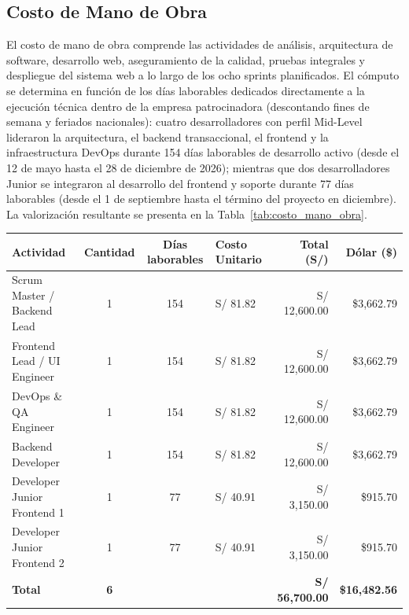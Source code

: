 \subsection{Costo de Mano de Obra}

El costo de mano de obra comprende las actividades de análisis, 
arquitectura de software, desarrollo web, aseguramiento de la calidad, 
pruebas integrales y despliegue del sistema web a lo largo de los ocho sprints planificados. 
El cómputo se determina en función de los días laborables dedicados directamente a la ejecución técnica dentro de la empresa patrocinadora (descontando fines de semana y feriados nacionales): 
cuatro desarrolladores con perfil Mid-Level lideraron la arquitectura, el backend transaccional, 
el frontend y la infraestructura DevOps durante 154 días laborables de desarrollo activo (desde el 12 de mayo hasta el 28 de diciembre de 2026);
mientras que dos desarrolladores Junior se integraron al desarrollo del frontend y soporte durante 77 días laborables (desde el 1 de septiembre hasta el término del proyecto en diciembre). 
La valorización resultante se presenta en la Tabla~\ref{tab:costo_mano_obra}.

\par
\noindent
\begin{minipage}{\linewidth}

    \begingroup
    \renewcommand{\baselinestretch}{1}
    \footnotesize
    \setlength{\tabcolsep}{4pt}
    \renewcommand{\arraystretch}{1.25}

    \begin{tabularx}{\linewidth}{@{}p{4.2cm}c c p{2.4cm}r r@{}}
        \toprule
        \textbf{Actividad} & \textbf{Cantidad} & \textbf{Días laborables} & \textbf{Costo Unitario} & \textbf{Total (S/)} & \textbf{Dólar (\$)} \\ \midrule
        Scrum Master / Backend Lead & 1 & 154 & S/ 81.82 & S/ 12,600.00 & \$3,662.79 \\ 
        Frontend Lead / UI Engineer & 1 & 154 & S/ 81.82 & S/ 12,600.00 & \$3,662.79 \\ 
        DevOps \& QA Engineer & 1 & 154 & S/ 81.82 & S/ 12,600.00 & \$3,662.79 \\ 
        Backend Developer & 1 & 154 & S/ 81.82 & S/ 12,600.00 & \$3,662.79 \\ 
        Developer Junior Frontend 1 & 1 & 77 & S/ 40.91 & S/ 3,150.00 & \$915.70 \\ 
        Developer Junior Frontend 2 & 1 & 77 & S/ 40.91 & S/ 3,150.00 & \$915.70 \\ \midrule
        \textbf{Total} & \textbf{6} & & & \textbf{S/ 56,700.00} & \textbf{\$16,482.56} \\ \bottomrule
    \end{tabularx}
    \endgroup

\end{minipage}
\finBloqueAPA